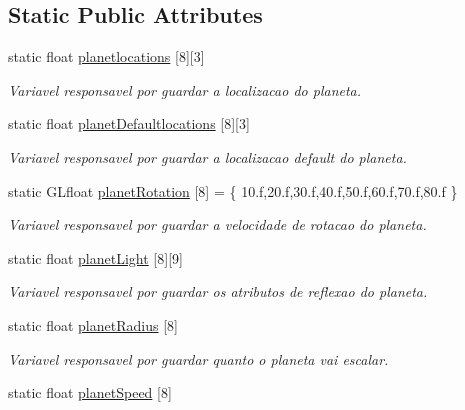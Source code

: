 \subsection*{Static Public Attributes}
\begin{DoxyCompactItemize}
\item 
static float \mbox{\hyperlink{class_scene_texture_a1492e81fe8f97df9c6798e46ab09cb28}{planetlocations}} \mbox{[}8\mbox{]}\mbox{[}3\mbox{]}
\begin{DoxyCompactList}\small\item\em Variavel responsavel por guardar a localizacao do planeta. \end{DoxyCompactList}\item 
static float \mbox{\hyperlink{class_scene_texture_acd7eab546d7fb95612c4708122a4871c}{planet\+Defaultlocations}} \mbox{[}8\mbox{]}\mbox{[}3\mbox{]}
\begin{DoxyCompactList}\small\item\em Variavel responsavel por guardar a localizacao default do planeta. \end{DoxyCompactList}\item 
static G\+Lfloat \mbox{\hyperlink{class_scene_texture_af88e169aa03c2541615de23ece5c6d80}{planet\+Rotation}} \mbox{[}8\mbox{]} = \{ 10.f,20.f,30.f,40.f,50.f,60.f,70.f,80.f \}
\begin{DoxyCompactList}\small\item\em Variavel responsavel por guardar a velocidade de rotacao do planeta. \end{DoxyCompactList}\item 
static float \mbox{\hyperlink{class_scene_texture_ac6f6512cb8d1c29b8d441554086506e0}{planet\+Light}} \mbox{[}8\mbox{]}\mbox{[}9\mbox{]}
\begin{DoxyCompactList}\small\item\em Variavel responsavel por guardar os atributos de reflexao do planeta. \end{DoxyCompactList}\item 
static float \mbox{\hyperlink{class_scene_texture_a8a848a35ca146f5d75c66caf13a120ef}{planet\+Radius}} \mbox{[}8\mbox{]}
\begin{DoxyCompactList}\small\item\em Variavel responsavel por guardar quanto o planeta vai escalar. \end{DoxyCompactList}\item 
static float \mbox{\hyperlink{class_scene_texture_a7d69f31178c4fa3ecc26a36201a1d2f9}{planet\+Speed}} \mbox{[}8\mbox{]}

\end{DoxyCompactItemize}
